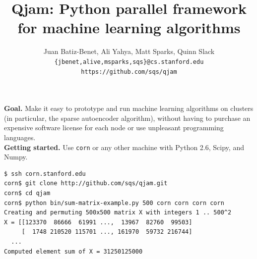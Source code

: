 \documentclass[10pt]{article}
\begin{document}

\title{\bf Qjam: Python parallel framework for machine learning algorithms}
\author{Juan Batiz-Benet, Ali Yahya, Matt Sparks, Quinn Slack \\
{\tt \{jbenet,alive,msparks,sqs\}@cs.stanford.edu} \\
{\tt https://github.com/sqs/qjam}}

\maketitle

{\bf Goal.} Make it easy to prototype and run machine learning algorithms on clusters (in particular, the sparse autoencoder algorithm), without having to purchase an expensive software license for each node or use unpleasant programming languages. \\

{\bf Getting started.} Use {\tt corn} or any other machine with Python 2.6, Scipy, and Numpy.

\begin{verbatim}
$ ssh corn.stanford.edu
corn$ git clone http://github.com/sqs/qjam.git
corn$ cd qjam
corn$ python bin/sum-matrix-example.py 500 corn corn corn corn
Creating and permuting 500x500 matrix X with integers 1 .. 500^2
X = [[123370  86666  61991 ...,  13967  82760  99503]
     [  1748 210520 115701 ..., 161970  59732 216744]
  ...
Computed element sum of X = 31250125000
\end{verbatim}
\end{document}
